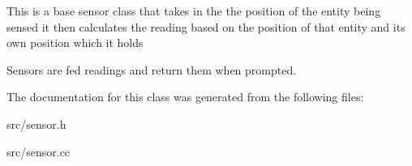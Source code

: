 This is a base sensor class that takes in the the position of the entity being sensed it then calculates the reading based on the position of that entity and its own position which it holds

Sensors are fed readings and return them when prompted. 

The documentation for this class was generated from the following files\+:\begin{DoxyCompactItemize}
\item 
src/sensor.\+h\item 
src/sensor.\+cc\end{DoxyCompactItemize}

